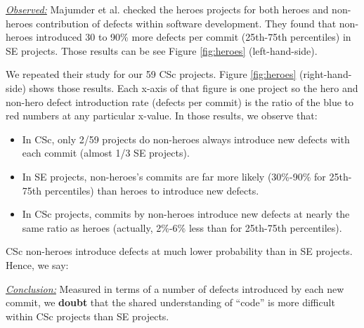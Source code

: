 \documentclass[conference,10pt]{IEEEtran}
\newcommand{\bi}{\begin{itemize}}
\newcommand{\ei}{\end{itemize}}
\newenvironment{RQ}{\vspace{1mm}\begin{tcolorbox}[enhanced,width=3.4in,size=fbox,colback=red!5!white,drop shadow southeast,sharp corners]}{\end{tcolorbox}}
\begin{document}
\noindent \textit{\underline{Observed:}} Majumder et al. \cite{majumder19_heroes} checked the heroes projects for both heroes and non-heroes contribution of defects within software development. They found that non-heroes introduced 30 to 90\% more defects per commit (25th-75th percentiles) in SE projects. Those
results can be see Figure \ref{fig:heroes} (left-hand-side).

We repeated their study for our 59 CSc projects.  Figure \ref{fig:heroes} (right-hand-side)
shows those results. Each x-axis of that figure is one project so the hero and non-hero defect introduction rate (defects per commit) is the ratio of the blue to red numbers
at any particular x-value.
In those results, we observe that:
\bi
\item In CSc, only 2/59 projects do non-heroes always introduce new defects with each commit (almost 1/3 SE projects).
\item In SE projects, non-heroes's commits are far more likely (30\%-90\% for 25th-75th percentiles) than heroes to introduce new defects.
\item In CSc projects, commits by non-heroes introduce new defects at nearly the same ratio as heroes (actually, 2\%-6\% less than for 25th-75th percentiles).
\ei
 
CSc non-heroes introduce defects at much lower probability than in SE projects. Hence, we say:

\begin{RQ}
\textit{\underline{Conclusion:}} Measured in terms
of a number of defects introduced by each new commit, we \textbf{doubt} that the shared understanding of ``code'' is more difficult within  CSc projects than SE projects.
\end{RQ}



\end{document}
